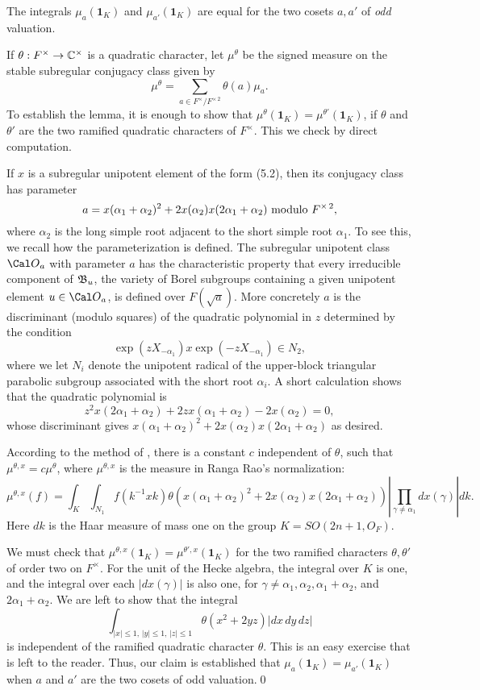  The integrals $\mu_a({\pmb 1}_K)$ and
$\mu_{a'}({\pmb 1}_K)$ are equal for the two 
cosets $a,a'$ of {\it odd} valuation.
\endproclaim

  If $\theta:F^\times\to{\Bbb C}^\times$ is a quadratic
character, let $\mu^\theta$ be the signed measure on the
stable subregular conjugacy class given by
$$\mu^\theta = \sum_{a\in F^\times/F^{\times\,2}}
  \theta(a) \mu_a.$$
To establish the lemma, it is enough to show that
$\mu^\theta({\pmb 1}_K) = \mu^{\theta'}({\pmb 1}_K)$, if
$\theta$ and $\theta'$ are the two ramified quadratic
characters of $F^\times$. This we check by direct
computation.

If $x$
is a subregular unipotent element
of the form (5.2), then its conjugacy class
has parameter $$a=x(\alpha_1+\alpha_2)^2 + 2 x(\alpha_2) x(2\alpha_1
+\alpha_2)\ \hbox{modulo}\ 
F^{\times\,2},$$ where $\alpha_2$ is the long simple root adjacent
to the short simple root $\alpha_1$. To see this, we recall how
the parameterization is defined.  The subregular unipotent class
$\O_a$
with parameter $a$ has the characteristic property that every
irreducible component of
${\frak B}_u$, the variety of Borel subgroups containing a given unipotent element $u\in \O_a$,
is defined over $F(\sqrt{a})$.
More concretely $a$ is the discriminant (modulo squares) of the
quadratic polynomial in $z$ determined by the condition
$$
\exp(z X_{-\alpha_1}) x \exp(-z X_{-\alpha_1}) \in N_{2},$$
where we let $N_{i}$ denote the unipotent radical of the
upper-block triangular
parabolic subgroup associated with the short root $\alpha_i$.
A short calculation shows that the quadratic polynomial is
$$z^2 x(2\alpha_1 + \alpha_2) +2 z x(\alpha_1+\alpha_2) - 2 x(\alpha_2)=0,$$
whose discriminant gives $x(\alpha_1 +\alpha_2)^2 + 2 x(\alpha_2)
x(2\alpha_1 + \alpha_2)$ as desired.  

According to the method of \cite{H4,3.9}, there is a constant $c$ independent
of $\theta$, such that $\mu^{\theta,x} = c\mu^\theta$, where 
$\mu^{\theta,x}$ is the measure in Ranga Rao's normalization:
$$\mu^{\theta,x}(f) = \int_K\int_{N_1} f(k^{-1} x k) 
\theta(x(\alpha_1+\alpha_2)^2 + 2 x(\alpha_2) x(2\alpha_1+\alpha_2))
\left|\prod_{\gamma\ne\alpha_1} dx(\gamma)\right| dk.$$
Here $dk$ is the Haar measure of mass one on the group
$K=SO(2n+1,O_F)$.  

We must check that $\mu^{\theta,x}({\pmb 1}_K) = \mu^{\theta',x}({\pmb 1}_K)$
for the two ramified characters $\theta,\theta'$ of order two on $F^\times$.
For the unit of the Hecke algebra, the integral over $K$ is one,
and the integral over each $|dx(\gamma)|$ is also one, for
$\gamma\ne \alpha_1,\alpha_2,\alpha_1+\alpha_2$, and $2\alpha_1+\alpha_2$.
We are left to show that the integral
$$\int_{|x|\le 1,\,|y|\le 1,\,|z|\le 1} \theta(x^2 + 2 y z) |dx\,dy\,dz|$$
is independent of the ramified quadratic character $\theta$.  This is
an easy exercise that is left to the reader.
Thus, our claim is established that $\mu_a({\pmb 1}_K)=\mu_{a'}({\pmb 1}_K)$
when $a$ and $a'$ are the two cosets of odd valuation.\qed\enddemo

